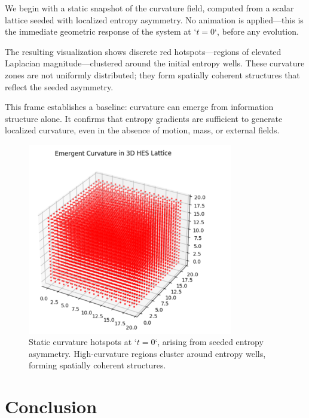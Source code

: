 \documentclass[12pt]{article}
\begin{document}
We begin with a static snapshot of the curvature field, computed from a scalar lattice seeded with localized entropy asymmetry. No animation is applied—this is the immediate geometric response of the system at `\( t = 0 \)`, before any evolution.

The resulting visualization shows discrete red hotspots—regions of elevated Laplacian magnitude—clustered around the initial entropy wells. These curvature zones are not uniformly distributed; they form spatially coherent structures that reflect the seeded asymmetry.

This frame establishes a baseline: curvature can emerge from information structure alone. It confirms that entropy gradients are sufficient to generate localized curvature, even in the absence of motion, mass, or external fields.

\begin{figure}[h]
    \centering
    \includegraphics[width=0.8\textwidth]{figures/Figure_6.PNG}
    \caption{Static curvature hotspots at `\( t = 0 \)`, arising from seeded entropy asymmetry. High-curvature regions cluster around entropy wells, forming spatially coherent structures.}
    \label{fig:static_curvature}
\end{figure}







\section{Conclusion}
\end{document}
